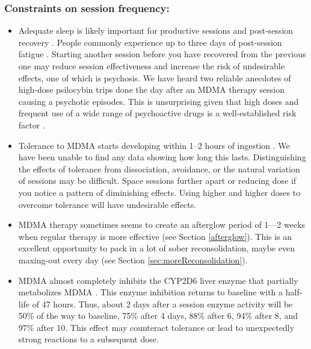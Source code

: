 \documentclass[12pt,letterpaper]{book}
\begin{document}
\subsubsection*{Constraints on session frequency:}
\begin{itemize}
    \item Adequate sleep is likely important for productive sessions and post-session recovery \cite{simon2020sleep}. People commonly experience up to three days of post-session fatigue \cite{liechtiGender}. Starting another session before you have recovered from the previous one may reduce session effectiveness and increase the risk of undesirable effects, one of which is psychosis. We have heard two reliable anecdotes of high-dose psilocybin trips done the day after an MDMA therapy session causing a psychotic episodes. This is unsurprising given that high doses and frequent use of a wide range of psychoactive drugs is a well-established risk factor \cite{drugsPsychosis}.
    \item Tolerance to MDMA starts developing within 1–2 hours of ingestion \cite{farreTolerance,parrottTolerance}. We have been unable to find any data showing how long this lasts. Distinguishing the effects of tolerance from dissociation, avoidance, or the natural variation of sessions may be difficult. Space sessions further apart or reducing dose if you notice a pattern of diminishing effects. Using higher and higher doses to overcome tolerance will have undesirable effects.
    \item MDMA therapy sometimes seems to create an afterglow period of 1—2 weeks when regular therapy is more effective (see Section \ref{afterglow}). This is an excellent opportunity to pack in a lot of sober reconsolidation, maybe even maxing-out every day (see Section \ref{sec:moreReconsolidation}).
    \item MDMA almost completely inhibits the CYP2D6 liver enzyme that partially metabolizes MDMA \cite{omathunaCYP}. This enzyme inhibition returns to baseline with a half-life of 47 hours. Thus, about 2 days after a session enzyme activity will be 50\% of the way to baseline, 75\% after 4 days, 88\% after 6, 94\% after 8, and 97\% after 10. This effect may counteract tolerance or lead to unexpectedly strong reactions to a subsequent dose.%

\end{itemize}
\end{document}
